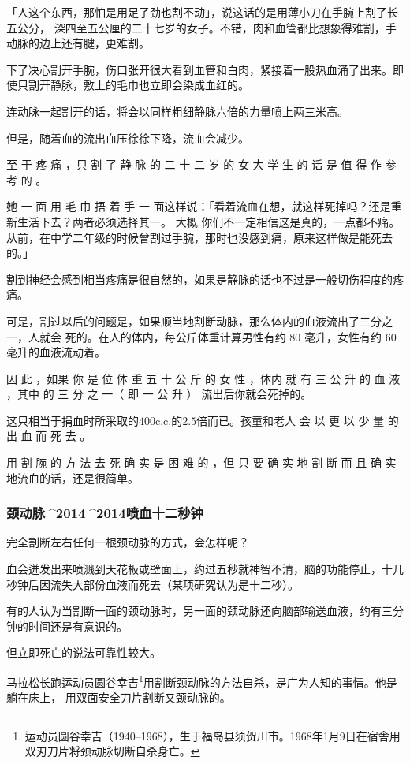 \documentclass[UTF8]{ctexart}
\begin{document}
「人这个东西，那怕是用足了劲也割不动」，说这话的是用薄小刀在手腕上割了长五公分，
深四至五公厘的二十七岁的女子。不错，肉和血管都比想象得难割，手动脉的边上还有腱，更难割。

下了决心割开手腕，伤口张开很大看到血管和白肉，紧接着一股热血涌了出来。即使只割开静脉，敷上的毛巾也立即会染成血红的。

连动脉一起割开的话，将会以同样粗细静脉六倍的力量喷上两三米高。

但是，随着血的流出血压徐徐下降，流血会减少。 

至 于 疼 痛 ，只 割 了 静 脉 的 二 十 二 岁 的 女 大 学 生 的 话 是 值 得 作 参 考 的 。

她 一 面 用 毛 巾 捂 着 手 一 面这样说：「看着流血在想，就这样死掉吗？还是重新生活下去？两者必须选择其一。
大概 你们不一定相信这是真的，一点都不痛。从前，在中学二年级的时候曾割过手腕，那时也没感到痛，原来这样做是能死去的。」 

割到神经会感到相当疼痛是很自然的，如果是静脉的话也不过是一般切伤程度的疼痛。

可是，割过以后的问题是，如果顺当地割断动脉，那么体内的血液流出了三分之一，人就会 死的。在人的体内，每公斤体重计算男性有约 $80$ 毫升，女性有约 $60$ 毫升的血液流动着。

因 此 ，如果 你 是 位 体 重 五 十 公 斤 的 女 性 ，体内 就 有 三 公 升 的 血 液 ，其中 的 三 分 之 一（ 即 一 公 升 ） 流出后你就会死掉的。

这只相当于捐血时所采取的$400$c.c.的$2.5$倍而已。孩童和老人 会 以 更 以 少 量 的 出 血 而 死 去 。

用 割 腕 的 方 法 去 死 确 实 是 困 难 的 ，但 只 要 确 实 地 割 断 而 且 确 实 地流血的话，还是很简单。

\subsubsection{颈动脉^^^^2014^^^^2014喷血十二秒钟}

完全割断左右任何一根颈动脉的方式，会怎样呢？

血会迸发出来喷溅到天花板或壁面上，约过五秒就神智不清，脑的功能停止，十几秒钟后因流失大部份血液而死去（某项研究认为是十二秒）。

有的人认为当割断一面的颈动脉时，另一面的颈动脉还向脑部输送血液，约有三分钟的时间还是有意识的。

但立即死亡的说法可靠性较大。

马拉松长跑运动员圆谷幸吉\footnote{运动员圆谷幸吉（1940–1968），生于福岛县须贺川市。1968年1月9日在宿舎用双刃刀片将颈动脉切断自杀身亡。}用割断颈动脉的方法自杀，是广为人知的事情。他是躺在床上， 用双面安全刀片割断又颈动脉的。
\end{document}
